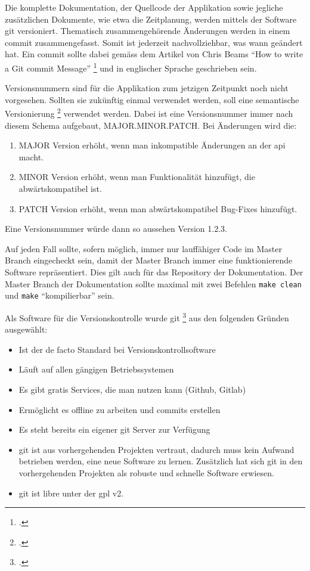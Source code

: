 Die komplette Dokumentation, der Quellcode der Applikation sowie jegliche
zusätzlichen Dokumente, wie etwa die Zeitplanung, werden mittels der Software
\gls{git} versioniert. Thematisch zusammengehörende Änderungen werden in einem
\gls{commit} zusammengefasst. Somit ist jederzeit nachvollziehbar, was wann
geändert hat. Ein \gls{commit} sollte dabei gemäss dem Artikel von Chris Beams
"`How to write a Git \gls{commit} Message"' \footcite{commit} und in englischer
Sprache geschrieben sein.

Versionsnummern sind für die Applikation zum jetzigen Zeitpunkt noch nicht
vorgesehen. Sollten sie zukünftig einmal verwendet werden, soll eine
semantische Versionierung \footcite{semver} verwendet werden. Dabei ist eine
Versionsnummer immer nach diesem Schema aufgebaut, MAJOR.MINOR.PATCH. Bei
Änderungen wird die:
\begin{enumerate}
\item MAJOR Version erhöht, wenn man inkompatible Änderungen an der \gls{api} macht.
\item MINOR Version erhöht, wenn man Funktionalität hinzufügt, die
abwärtskompatibel ist.
\item PATCH Version erhöht, wenn man abwärtskompatibel Bug-Fixes hinzufügt.
\end{enumerate}
Eine Versionsnummer würde dann so aussehen Version 1.2.3.

Auf jeden Fall sollte, sofern möglich, immer nur lauffähiger Code im Master
Branch eingecheckt sein, damit der Master Branch immer eine funktionierende
Software repräsentiert. Dies gilt auch für das Repository der Dokumentation.
Der Master Branch der Dokumentation sollte maximal mit zwei Befehlen \texttt{make
clean} und \texttt{make} "`kompilierbar"' sein.

Als Software für die Versionskontrolle wurde \gls{git} \footcite{git} aus den
folgenden Gründen ausgewählt:

\begin{itemize}
\item Ist der de facto Standard bei Versionskontrollsoftware
\item Läuft auf allen gängigen Betriebssystemen
\item Es gibt gratis Services, die man nutzen kann (Github, Gitlab)
\item Ermöglicht es offline zu arbeiten und \glspl{commit} erstellen
\item Es steht bereits ein eigener \gls{git} Server zur Verfügung
\item \gls{git} ist aus vorhergehenden Projekten vertraut,
dadurch muss kein Aufwand betrieben werden, eine neue Software zu lernen.
Zusätzlich hat sich \gls{git} in den vorhergehenden Projekten als robuste
und schnelle Software erwiesen.
\item \gls{git} ist \gls{libre} unter der \gls{gpl} v2.
\end{itemize}


